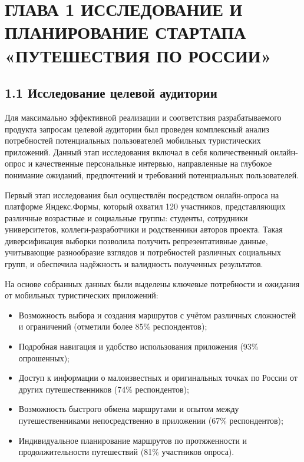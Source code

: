 \section{ГЛАВА 1 ИССЛЕДОВАНИЕ И ПЛАНИРОВАНИЕ СТАРТАПА «ПУТЕШЕСТВИЯ ПО РОССИИ»}

\subsection*{1.1 Исследование целевой аудитории}

Для максимально эффективной реализации и соответствия разрабатываемого продукта запросам целевой аудитории был проведен комплексный анализ потребностей потенциальных пользователей мобильных туристических приложений. Данный этап исследования включал в себя количественный онлайн-опрос и качественные персональные интервью, направленные на глубокое понимание ожиданий, предпочтений и требований потенциальных пользователей.

Первый этап исследования был осуществлён посредством онлайн-опроса на платформе Яндекс.Формы, который охватил 120 участников, представляющих различные возрастные и социальные группы: студенты, сотрудники университетов, коллеги-разработчики и родственники авторов проекта. Такая диверсификация выборки позволила получить репрезентативные данные, учитывающие разнообразие взглядов и потребностей различных социальных групп, и обеспечила надёжность и валидность полученных результатов.

На основе собранных данных были выделены ключевые потребности и ожидания от мобильных туристических приложений:
\begin{itemize}
    \item Возможность выбора и создания маршрутов с учётом различных сложностей и ограничений (отметили более 85\% респондентов);
    \item Подробная навигация и удобство использования приложения (93\% опрошенных);
    \item Доступ к информации о малоизвестных и оригинальных точках по России от других путешественников (74\% респондентов);
    \item Возможность быстрого обмена маршрутами и опытом между путешественниками непосредственно в приложении (67\% респондентов);
    \item Индивидуальное планирование маршрутов по протяженности и продолжительности путешествий (81\% участников опроса).
\end{itemize}


